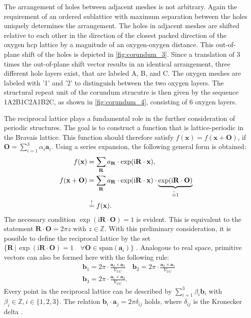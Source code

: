 The arrangement of holes between adjacent meshes is not arbitrary. 
Again the requirement of an ordered sublattice with maximum separation between the holes uniquely 
determines the arrangement. 
The holes in adjacent meshes are shifted relative to each other in the direction of the closest packed
direction of the oxygen hcp lattice by a magnitude of an oxygen-oxygen distance. 
This out-of-plane shift of the holes is depicted in \cref{fig:corundum_3}.
Since a translation of 3 times the out-of-plane shift vector results in an identical arrangement, 
three different hole layers exist, that are labeled A, B, and C.
The oxygen meshes are labeled with '1' and '2' to distinguish between the two oxygen layers. 
The structural repeat unit of the corundum strucutre is then given by the sequence 1A2B1C2A1B2C, 
as shown in \cref{fig:corundum_4}, consisting of 6 oxygen layers. 


The reciprocal lattice plays a fundamental role in the further consideration of periodic structures.
The goal is to construct a function that is lattice-periodic in the Bravais lattice.
This function should therefore satisfy
$f(\mathbf{x})=f(\mathbf{x}+\mathbf{O})$, if $\mathbf{O}=\sum_{i=1}^{3} \alpha_{i}\mathbf{a}_{i}$.
Using a series expansion, the following general form is obtained:
\begin{align}
    f(\mathbf{x})&=\sum_{\mathbf{R}}a_{\mathbf{R}}\cdot \exp(\mathrm{i}\mathbf{R}\cdot\mathbf{x}), \notag\\
    f(\mathbf{x}+\mathbf{O})&=\sum_{\mathbf{R}}a_{\mathbf{R}}\cdot \exp(\mathrm{i}\mathbf{R}\cdot \mathbf{x})\cdot \notag
    \underbrace{ \exp(\mathrm{i}\mathbf{R}\cdot \mathbf{O}) }_{ \stackrel{!}{=}1 }  \\
    &\stackrel{!}{=} f(\mathbf{x}).
\end{align}
The necessary condition $\exp(\mathrm{i}\mathbf{R}\cdot \mathbf{O})=1$ is evident.
This is equivalent to the statement $\mathbf{R}\cdot \mathbf{O}=2\pi z$ with $z \in \mathbb{Z}$.
With this preliminary consideration, it is possible to define the reciprocal lattice by the set
$\{ \mathbf{R} \,\vert\, \exp(\mathrm{i}\mathbf{R}\cdot \mathbf{O})=1 \quad
\forall \mathbf{O} \in \text{span}(\mathbf{a}_{i}) \}$ \autocite{Ashcroft}.
Analogous to real space, primitive vectors can also be formed here with the following rule:
\begin{align}
    &\mathbf{b}_{1} = 2\pi \cdot \frac{\mathbf{a}_{2} \times \mathbf{a}_{3}}{V_{\mathrm{UC}}} \quad
    \mathbf{b}_{2} = 2\pi \cdot \frac{\mathbf{a}_{3} \times \mathbf{a}_{1}}{V_{\mathrm{UC}}} \\
    &\mathbf{b}_{3} = 2\pi \cdot \frac{\mathbf{a}_{1} \times \mathbf{a}_{2}}{V_{\mathrm{UC}}}.
\end{align}
Every point in the reciprocal lattice can be described by $\sum_{i=1}^{3} \beta_{i}\mathbf{b}_{i}$ with $\beta_i \in \mathbb{Z},
i\in\{1,2,3\}$.
The relation $\mathbf{b}_{i}\cdot \mathbf{a}_{j}=2 \pi \delta_{ij}$ holds,
where $\delta_{ij}$ is the Kronecker delta \autocite{Ashcroft}.

